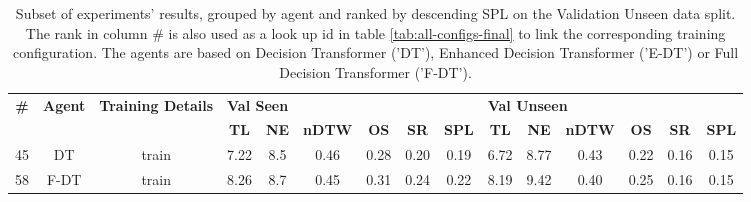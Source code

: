 \begin{table}
\centering
\caption{\label{tab:rezero}Subset of experiments' results, grouped by agent and ranked by descending SPL on the Validation Unseen data split. The rank in column \# is also used as a look up id in table \ref{tab:all-configs-final} to link the corresponding training configuration.     \newline The agents are based on Decision Transformer ('DT'), Enhanced Decision Transformer ('E-DT') or Full Decision Transformer ('F-DT').}
\begin{tabular}{@{\hskip3pt}c@{\hskip3pt}c@{\hskip3pt}c@{\hskip3pt}c@{\hskip3pt}c@{\hskip3pt}c@{\hskip3pt}c@{\hskip3pt}c@{\hskip3pt}c@{\hskip3pt}c@{\hskip3pt}c@{\hskip3pt}c@{\hskip3pt}c@{\hskip3pt}c@{\hskip3pt}c}
\toprule
\textbf{\#} & \textbf{Agent} & \textbf{Training Details} & \multicolumn{6}{l}{\textbf{Val Seen}} & \multicolumn{6}{l}{\textbf{Val Unseen}} \\
 \textbf{~} &     \textbf{~} &                \textbf{~} &       \textbf{TL} & \textbf{NE} & \textbf{nDTW} & \textbf{OS} & \textbf{SR} & \textbf{SPL} &         \textbf{TL} & \textbf{NE} & \textbf{nDTW} & \textbf{OS} & \textbf{SR} & \textbf{SPL} \\
\midrule
         45 &             DT &                     train &              7.22 &         8.5 &          0.46 &        0.28 &        0.20 &         0.19 &                6.72 &        8.77 &          0.43 &        0.22 &        0.16 &         0.15 \\
         58 &           F-DT &                     train &              8.26 &         8.7 &          0.45 &        0.31 &        0.24 &         0.22 &                8.19 &        9.42 &          0.40 &        0.25 &        0.16 &         0.15 \\
\bottomrule
\end{tabular}
\end{table}
